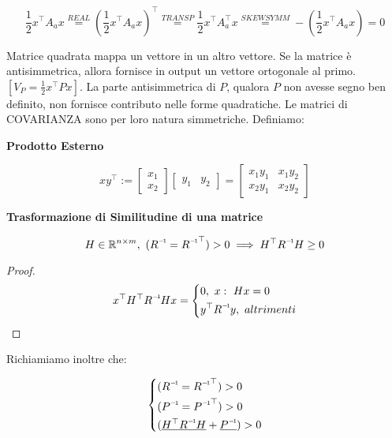 \[
	\frac{1}{2}x^\top A_ax \stackrel{REAL}{=} (\frac{1}{2}x^\top A_ax)^\top \stackrel{TRANSP}{=} \frac{1}{2}x^\top A_a^\top x \stackrel{SKEWSYMM}{=} -(\frac{1}{2}x^\top A_ax) = 0
\]

Matrice quadrata mappa un vettore in un altro vettore. Se la matrice è antisimmetrica, allora fornisce in output un vettore ortogonale al primo. $[V_P=\frac{1}{2}x^\top Px]$. La parte antisimmetrica di $P$, qualora $P$ non avesse segno ben definito, non fornisce contributo nelle forme quadratiche. Le matrici di COVARIANZA sono per loro natura simmetriche. Definiamo:

\begin{defn}{\textbf{Prodotto Esterno}}

\[
	xy^\top := \begin{bmatrix}x_1\\x_2\end{bmatrix}\begin{bmatrix}y_1&y_2\end{bmatrix} = \begin{bmatrix}x_1y_1&x_1y_2\\x_2y_1&x_2y_2\end{bmatrix}
\]

\end{defn}

\begin{thrm}{\textbf{Trasformazione di Similitudine di una matrice}}

\[
	H\in\R^{n\times m},\ (\inv{R}=\inv{R}^\top)>0 \implies H^\top \inv{R}H\geq 0
\]

\end{thrm}

\begin{proof}

\[
	x^\top H^\top \inv{R}Hx =
	\left\{
	\begin{aligned}
	&0,\ x:\ Hx=0\\
	&y^\top\inv{R}y,\ altrimenti
	\end{aligned}
	\right.
\]
 
\end{proof}

Richiamiamo inoltre che:

\[
	\left\{
	\begin{aligned}
	&(\inv{R}=\inv{R}^\top)>0\\
	&(\inv{P}=\inv{P}^\top)>0\\
	&(\underline{H^\top\inv{R}H} + \underline{\inv{P}}) > 0
	\end{aligned}
	\right.
\]
	
